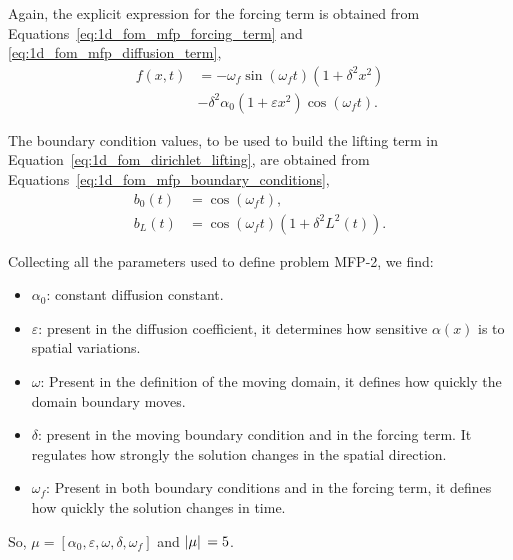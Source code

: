 \documentclass[../main.tex]{subfiles}
\begin{document}
Again, the explicit expression for the forcing term is obtained from Equations~\eqref{eq:1d_fom_mfp_forcing_term} and \eqref{eq:1d_fom_mfp_diffusion_term},
\begin{equation}
    \begin{split}
        f(x,t) &= -\omega_f \sin{(\omega_f t)}(1+\delta^2 x^2) \\ 
        &- \delta^2 \alpha_0(1 + \varepsilon x^2) \cos{(\omega_f t)}.
    \end{split}
\end{equation}

The boundary condition values, to be used to build the lifting term in Equation~\eqref{eq:1d_fom_dirichlet_lifting}, are obtained from Equations~\eqref{eq:1d_fom_mfp_boundary_conditions},
\begin{subequations}
    \begin{align}
        b_0(t) &= \cos{(\omega_f t)}, \\
        b_L(t) &= \cos{(\omega_f t)}\left(1 + \delta^2 L^{2}(t)\right).
    \end{align}
\end{subequations}

Collecting all the parameters used to define problem MFP-2, we find:
\begin{itemize}
    \item $\alpha_0$: constant diffusion constant. 
    \item $\varepsilon$: present in the diffusion coefficient, it determines how sensitive $\alpha(x)$ is to spatial variations. 
    \item $\omega$: Present in the definition of the moving domain, it defines how quickly the domain boundary moves.
    \item $\delta$: present in the moving boundary condition and in the forcing term. 
    It regulates how strongly the solution changes in the spatial direction.
    \item $\omega_f$: Present in both boundary conditions and in the forcing term, it defines how quickly the solution changes in time.
\end{itemize}
So, $\mu = [\alpha_0, \varepsilon, \omega, \delta, \omega_f]$ and $\abs*{\mu} = 5$.
\end{document}
